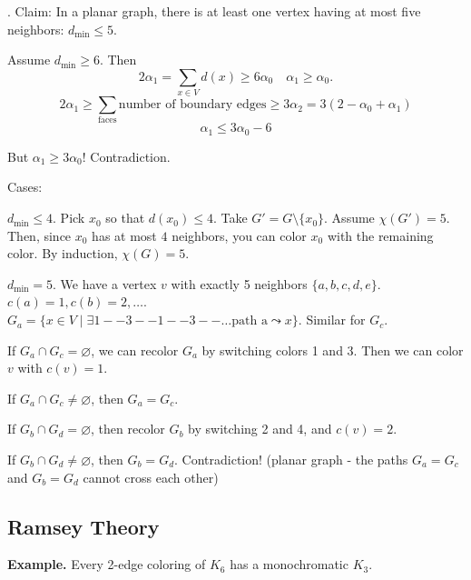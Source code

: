 \def\dmin{\ensuremath{d_{\text{min}}}}
\Proof.
Claim: In a planar graph, there is at least one vertex having at most five neighbors:
$\dmin ≤ 5$.

Assume $\dmin ≥ 6$.
Then
\[
  2\alpha_1 = \sum_{x\in V} d(x) ≥ 6\alpha_0\quad
  \alpha_1 ≥ \alpha_0.
\]
\[
  2\alpha_1 ≥
  \sum_{\text{faces}} \text{number of boundary edges} ≥
  3\alpha_2 =
  3 (2 - \alpha_0 + \alpha_1)
\]
\[
  \alpha_1 ≤ 3\alpha_0 - 6
\]

But $\alpha_1 ≥ 3\alpha_0$! Contradiction.

Cases: \\
\begin{compactenum}
  \item $\dmin \leq 4$. Pick $x_0$ so that $d(x_0) \leq 4$.
Take $G' = G \setminus \{x_0\}$. Assume $\chi(G')=5$. Then, since $x_0$ has at most $4$ neighbors, you can color $x_0$ with the remaining color. By induction, $\chi(G)=5$.

  \item $d_{\text{min}}=5$.
We have a vertex $v$ with exactly 5 neighbors $\{a,b,c,d,e\}$.
$c(a) = 1, c(b) = 2,\ldots$.
\\
$G_a = \{x\in V\mid \exists 1--3--1--3--\ldots \text{path a} \leadsto x\}$.
Similar for $G_c$.
  \begin{compactenum}
    \item If $G_a\cap G_c =\varnothing$, we can recolor $G_a$ by switching colors 1 and 3. Then we can color $v$ with $c(v) = 1$.

    \item If $G_a\cap G_c ≠ \varnothing$, then $G_a = G_c$.
    \begin{compactenum}
      \item If $G_b\cap G_d =\varnothing$, then recolor $G_b$ by switching 2 and 4, and $c(v) = 2$.
      \item If $G_b\cap G_d ≠\varnothing$, then $G_b = G_d$. Contradiction! (planar graph - the paths $G_a=G_c$ and $G_b=G_d$ cannot cross each other)
    \end{compactenum}
  \end{compactenum}
\end{compactenum}

\subsection{Ramsey Theory}

\textbf{Example.} Every 2-edge coloring of $K_6$ has a monochromatic $K_3$.

